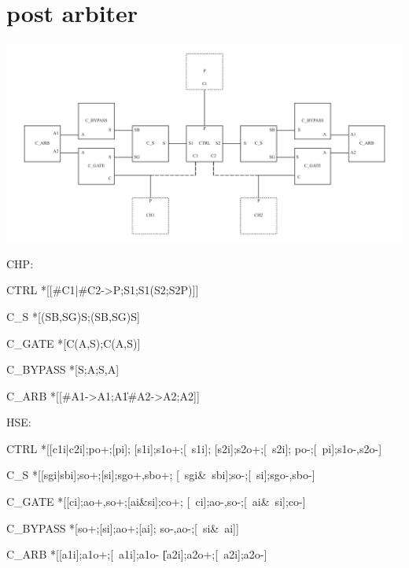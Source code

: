 \documentclass{article}
\begin{document}
\section{post arbiter}

\includegraphics[width=\textwidth]{img/transmitter/arb.pdf}

\noindent CHP:

\begin{csp}
CTRL\equiv
  *[[#{C1}|#{C2}->P;S1;S1\star(S2;S2\star\!P)]]
\end{csp}
\begin{csp}
C_S\equiv
  *[(SB,SG)\star\!S;(SB,SG)\star\!S]
\end{csp}
\begin{csp}  
C_GATE\equiv
  *[C\star(A,S);C\star(A,S)]
\end{csp}
\begin{csp}
C_BYPASS\equiv
  *[S;A;S,A]
\end{csp}
\begin{csp}
C_ARB\equiv
  *[[#{A1}->A1;A1\|#{A2}->A2;A2]]
\end{csp}

\noindent HSE:

\begin{hse}
CTRL\equiv
  *[[c1i|c2i];po+;[pi];
    [s1i];s1o+;[~s1i];
    [s2i];s2o+;[~s2i];
    po-;[~pi];s1o-,s2o-]
\end{hse}
\begin{hse}
C_S\equiv
  *[[sgi|sbi];so+;[si];sgo+,sbo+;
    [~sgi&~sbi];so-;[~si];sgo-,sbo-]
\end{hse}
\begin{hse}
C_GATE\equiv    
  *[[ci];ao+,so+;[ai&si];co+;
    [~ci];ao-,so-;[~ai&~si];co-]
\end{hse}
\begin{hse}
C_BYPASS\equiv
  *[so+;[si];ao+;[ai];
    so-,ao-;[~si&~ai]]
\end{hse}
\begin{hse}
C_ARB\equiv
  *[[a1i];a1o+;[~a1i];a1o-
   \|[a2i];a2o+;[~a2i];a2o-]
\end{hse}
\end{document}
